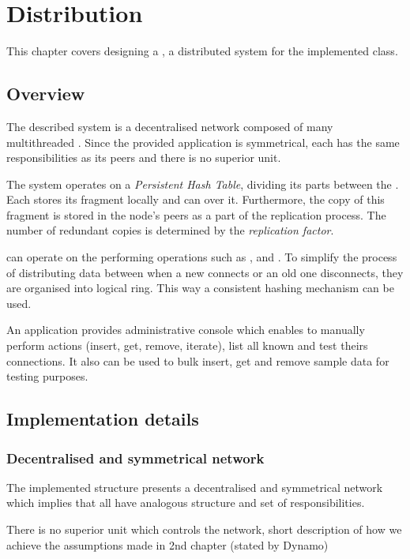 \chapter{Distribution}

This chapter covers designing a \DHTS, a distributed system for the implemented \PHT class.

\section{Overview}

    The described system is a decentralised network composed of many multithreaded \Nodes.
    Since the provided application is symmetrical, each \Node has the same responsibilities as its peers and there is no superior unit.

    The system operates on a \textit{Persistent Hash Table}, dividing its parts between the \Nodes.
    Each \Node stores its \PHT fragment locally and can \iterateMethod over it.
    Furthermore, the copy of this fragment is stored in the node's peers as a part of the replication process.
    The number of redundant copies is determined by the \textit{replication factor}.
    
    \Nodes can operate on the \PHT performing operations such as \insertMethod, \getMethod and \removeMethod.
    To simplify the process of distributing data between \Nodes when a new \Node connects or an old one disconnects, they are organised into logical ring.
    This way a consistent hashing mechanism can be used.
    
    
    An application provides administrative console which enables to manually perform \PHT actions (insert, get, remove, iterate), list all known \Nodes and test theirs connections.
    It also can be used to bulk insert, get and remove sample data for testing purposes.
    
\section{Implementation details}
    \subsection{Decentralised and symmetrical network}
        The implemented structure presents a decentralised and symmetrical network which implies that all \Nodes have analogous structure and set of responsibilities.
        
        There is no superior unit which controls the network, 
    short description of how we achieve the assumptions made in 2nd chapter (stated by Dynamo)
    
